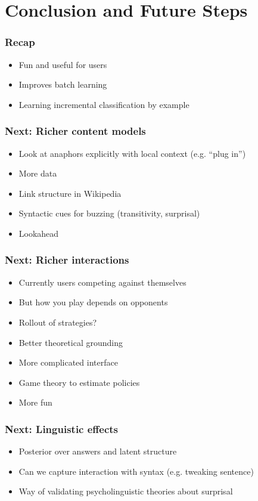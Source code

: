 
\section{Conclusion and Future Steps}


\begin{frame}

	\frametitle{Recap}

	\begin{itemize}
			\item Fun and useful for users
			\item Improves batch learning
			\item Learning incremental classification by example
	\end{itemize}
\end{frame}

\begin{frame}
	\frametitle{Next: Richer content models}
	\begin{itemize}
		\item Look at anaphors explicitly with local context (e.g. ``plug in'')
		\item More data
		\item Link structure in Wikipedia
		\item Syntactic cues for buzzing (transitivity, surprisal)
		\item Lookahead
	\end{itemize}
\end{frame}

\begin{frame}
	\frametitle{Next: Richer interactions}
		\begin{itemize}
			\item Currently users competing against themselves
			\item But how you play depends on opponents
			\item Rollout of strategies?~\cite{tesauro-96}
			\item Better theoretical grounding~\cite{li-08}
			\item More complicated interface
			\item Game theory to estimate policies
			\item More fun
		\end{itemize}
\end{frame}

\begin{frame}
	\frametitle{Next: Linguistic effects}
		\begin{itemize}
			\item Posterior over answers and latent structure
			\item Can we capture interaction with syntax (e.g. tweaking sentence)
			\item Way of validating psycholinguistic theories about surprisal
		\end{itemize}
\end{frame}

